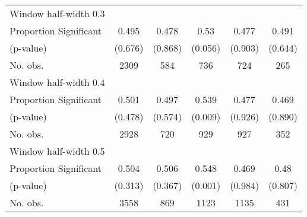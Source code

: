 \begin{tabular}{l*{5}{c}}
\hline
Window half-width 0.3\\

Proportion Significant& 0.495 &  0.478 &  0.53 &  0.477 &  0.491\\

(p-value) & (0.676) &  (0.868) &  (0.056) &  (0.903) &  (0.644)\\

No. obs.& 2309 &  584 &  736 &  724 &  265\\

\hline
Window half-width 0.4\\

Proportion Significant& 0.501 &  0.497 &  0.539 &  0.477 &  0.469\\

(p-value) & (0.478) &  (0.574) &  (0.009) &  (0.926) &  (0.890)\\

No. obs.& 2928 &  720 &  929 &  927 &  352\\

\hline
Window half-width 0.5\\

Proportion Significant& 0.504 &  0.506 &  0.548 &  0.469 &  0.48\\

(p-value) & (0.313) &  (0.367) &  (0.001) &  (0.984) &  (0.807)\\

No. obs.& 3558 &  869 &  1123 &  1135 &  431\\

\hline\hline
\end{tabular}

